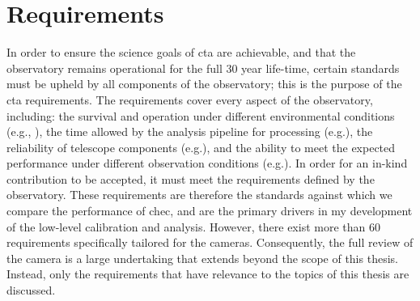 \section{Requirements}

In order to ensure the science goals of \gls{cta} are achievable, and that the observatory remains operational for the full 30 year life-time, certain standards must be upheld by all components of the observatory; this is the purpose of the \gls{cta} requirements. The requirements cover every aspect of the observatory, including: the survival and operation under different environmental conditions (e.g.\@ {}, ), the time allowed by the analysis pipeline for processing (e.g.\@ {}), the reliability of telescope components (e.g.\@ {}), and the ability to meet the expected performance under different observation conditions (e.g.\@ {}). In order for an in-kind contribution to be accepted, it must meet the requirements defined by the observatory. These requirements are therefore the standards against which we compare the performance of \gls{chec}, and are the primary drivers in my development of the low-level calibration and analysis. However, there exist more than 60 requirements specifically tailored for the cameras. Consequently, the full review of the camera is a large undertaking that extends beyond the scope of this thesis. Instead, only the requirements that have relevance to the topics of this thesis are discussed.

